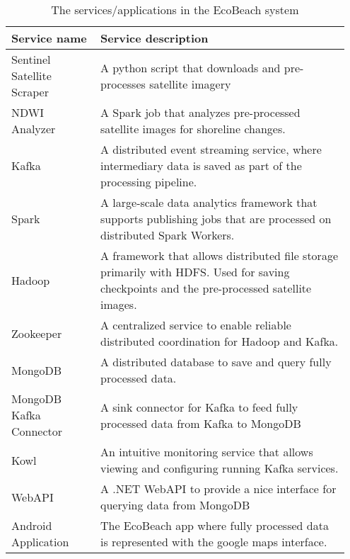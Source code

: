\begin{table}[]
    \centering
    \begin{tabular}{| p{0.25\linewidth} | p{0.7\linewidth} |}
        \hline
        \textbf{Service name}      & \textbf{Service description}                                                                                                              \\ \hline
        Sentinel Satellite Scraper & A python script that downloads and pre-processes satellite imagery                                                                        \\\hline
        NDWI Analyzer              & A Spark job that analyzes pre-processed satellite images for shoreline changes.                                                           \\\hline
        Kafka                      & A distributed event streaming service, where intermediary data is saved as part of the processing pipeline.                               \\\hline
        Spark                      & A large-scale data analytics framework that supports publishing jobs that are processed on distributed Spark Workers.                     \\\hline
        Hadoop                     & A framework that allows distributed file storage primarily with HDFS. Used for saving checkpoints and the pre-processed satellite images. \\\hline
        Zookeeper                  & A centralized service to enable reliable distributed coordination for Hadoop and Kafka.                                                   \\\hline
        MongoDB                    & A distributed database to save and query fully processed data.                                                                            \\\hline
        MongoDB Kafka Connector    & A sink connector for Kafka to feed fully processed data from Kafka to MongoDB                                                             \\\hline
        Kowl                       & An intuitive monitoring service that allows viewing and configuring running Kafka services.                                               \\\hline
        WebAPI                     & A .NET WebAPI to provide a nice interface for querying data from MongoDB                                                                  \\\hline
        Android Application        & The EcoBeach app where fully processed data is represented with the google maps interface.                                                \\\hline
    \end{tabular}
    \caption{The services/applications in the EcoBeach system}
    \label{tab:ecobeach-services}
\end{table}

